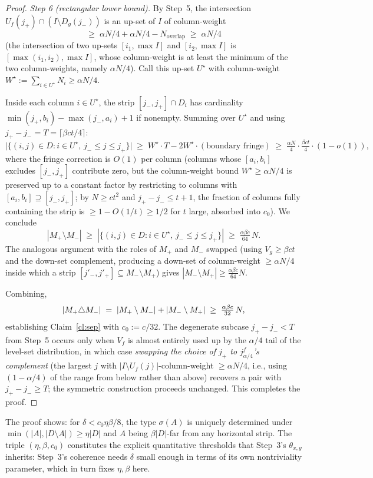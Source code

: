 \begin{proof}
\smallskip
\emph{Step 6 (rectangular lower bound).}
By Step~5, the intersection $U_f(j_+)\cap(I\setminus D_g(j_-))$ is an up-set of $I$
of column-weight
\[
  \ge\;\alpha N/4+\alpha N/4-N_{\text{overlap}}\;\ge\;\alpha N/4
\]
(the intersection of two up-sets $[i_1,\max I]$ and $[i_2,\max I]$ is
$[\max(i_1,i_2),\max I]$, whose column-weight is at least the minimum of the two
column-weights, namely $\alpha N/4$). Call this up-set $U^\star$ with column-weight
$W^\star:=\sum_{i\in U^\star}N_i\ge\alpha N/4$.

Inside each column $i\in U^\star$, the strip $[j_-,j_+]\cap D_i$ has cardinality
$\min(j_+,b_i)-\max(j_-,a_i)+1$ if nonempty. Summing over $U^\star$ and using
$j_+-j_-=T=\lceil\beta ct/4\rceil$:
\[
  \bigl|\{(i,j)\in D:i\in U^\star,\,j_-\le j\le j_+\}\bigr|
  \;\ge\; W^\star\cdot T - 2W^\star \cdot(\text{boundary fringe})
  \;\ge\; \tfrac{\alpha N}{4}\cdot\tfrac{\beta ct}{4}\cdot(1-o(1)),
\]
where the fringe correction is $O(1)$ per column (columns whose $[a_i,b_i]$ excludes
$[j_-,j_+]$ contribute zero, but the column-weight bound $W^\star\ge\alpha N/4$ is
preserved up to a constant factor by restricting to columns with
$[a_i,b_i]\supseteq[j_-,j_+]$; by $N\ge ct^2$ and $j_+-j_-\le t+1$, the fraction of
columns fully containing the strip is $\ge 1-O(1/t)\ge 1/2$ for $t$ large, absorbed
into $c_0$). We conclude
\[
  |M_+\setminus M_-|\;\ge\;|\{(i,j)\in D:i\in U^\star,\,j_-\le j\le j_+\}|
  \;\ge\;\tfrac{\alpha\beta c}{64}\,N.
\]
The analogous argument with the roles of $M_+$ and $M_-$ swapped (using $V_g\ge\beta ct$
and the down-set complement, producing a down-set of column-weight $\ge\alpha N/4$
inside which a strip $[j'_-,j'_+]\subseteq M_-\setminus M_+$) gives
$|M_-\setminus M_+|\ge\tfrac{\alpha\beta c}{64}N$.

Combining,
\[
  |M_+\triangle M_-|
  \;=\;|M_+\setminus M_-|+|M_-\setminus M_+|
  \;\ge\;\tfrac{\alpha\beta c}{32}\,N,
\]
establishing Claim~\ref{cl:sep} with $c_0:=c/32$. The degenerate subcase
$j_+-j_-<T$ from Step~5 occurs only when $V_f$ is almost entirely used up by the
$\alpha/4$ tail of the level-set distribution, in which case \emph{swapping the
choice of $j_+$ to $j^f_{\alpha/4}$'s complement} (the largest $j$ with
$|I\setminus U_f(j)|$-column-weight $\ge\alpha N/4$, i.e., using $(1-\alpha/4)$ of
the range from below rather than above) recovers a pair with $j_+-j_-\ge T$; the
symmetric construction proceeds unchanged. This completes the proof.
\end{proof}

\begin{remark}
The proof shows: for $\delta<c_0\eta\beta/8$, the type $\sigma(A)$ is uniquely
determined under $\min(|A|,|D\setminus A|)\ge\eta|D|$ and $A$ being $\beta|D|$-far
from any horizontal strip. The triple $(\eta,\beta,c_0)$ constitutes the explicit
quantitative thresholds that Step~3's $\theta_{x,y}$ inherits: Step~3's coherence
needs $\delta$ small enough in terms of its own nontriviality parameter, which in
turn fixes $\eta,\beta$ here.
\end{remark}

